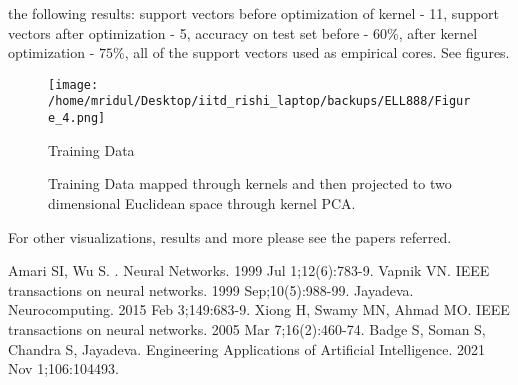 \documentclass[11pt]{article}
\begin{document}
the following results: support vectors before optimization of kernel - 11, support vectors
after optimization - 5, accuracy on test set before - $60\%$, after kernel optimization - $75\%$,
all of the support vectors used as empirical cores. See figures.
\begin{figure}[!htbp]
    \centering
    \texttt{[image: /home/mridul/Desktop/iitd\_rishi\_laptop/backups/ELL888/Figure\_4.png]}
    \caption{\label{fig:data}Training Data}
\end{figure}
\begin{figure}[!htbp]
    \centering
    \caption{\label{fig:kernelPCA}Training Data mapped through kernels and then projected
    to two dimensional Euclidean space through kernel PCA.}
\end{figure}\par
For other visualizations, results and more please see the papers referred.
\afterpage{\clearpage}


	
	
	\begin{thebibliography}{10}
            Amari SI, Wu S. 
            .
            \newblock Neural Networks. 1999 Jul 1;12(6):783-9.
            Vapnik VN. 
            \newblock IEEE transactions on neural networks. 1999 Sep;10(5):988-99.
            Jayadeva.  \newblock Neurocomputing. 2015 Feb 3;149:683-9.
            Xiong H, Swamy MN, Ahmad MO. \newblock IEEE transactions on neural networks. 2005 Mar
            7;16(2):460-74.
            Badge S, Soman S, Chandra S, Jayadeva. \newblock Engineering Applications of
            Artificial Intelligence. 2021 Nov 1;106:104493.
	\end{thebibliography}
	
	
	
\end{document}
